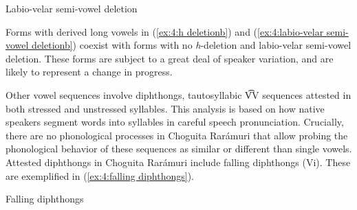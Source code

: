 \ea\label{ex:4:labio-velar semi-vowel deletion}
{Labio-velar semi-vowel deletion}

    \label{ex:4:labio-velar semi-vowel deletiona}
        \label{ex:4:labio-velar semi-vowel deletionb}
    \z
\z

Forms with derived long vowels in (\ref{ex:4:h deletionb}) and (\ref{ex:4:labio-velar semi-vowel deletionb}) coexist with forms with no \textit{h}{}-deletion and labio-velar semi-vowel deletion. These forms are subject to a great deal of speaker variation, and are likely to represent a change in progress.

Other vowel sequences involve diphthongs, tautosyllabic V͡V sequences attested in both stressed and unstressed syllables. This analysis is based on how native speakers segment words into syllables in careful speech pronunciation. Crucially, there are no phonological processes in Choguita Rarámuri that allow probing the phonological behavior of these sequences as similar or different than single vowels. Attested diphthongs in Choguita Rarámuri include falling diphthongs (Vi). These are exemplified in (\ref{ex:4:falling diphthongs}).

\ea\label{ex:4:falling diphthongs}
{Falling diphthongs}

